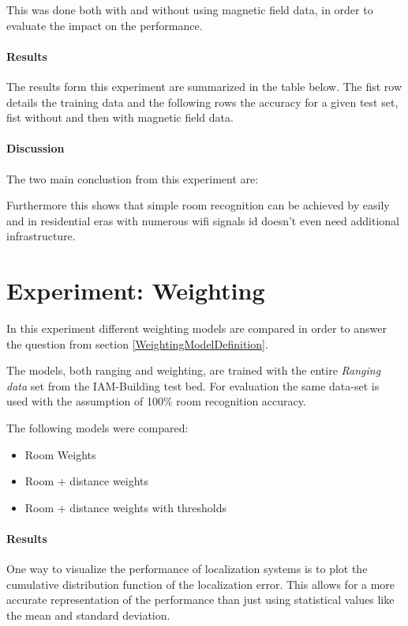 This was done both with and without using magnetic field data, in order to evaluate the impact  on the performance.

\paragraph{Results}
The results form this experiment are summarized in the table below. The fist row details the training data and the following rows the accuracy for a given test set, fist without and then with magnetic field data.


\paragraph{Discussion}

The two main conclustion from this experiment are:



Furthermore this shows that simple room recognition can be achieved by easily and in residential eras with numerous wifi signals id doesn't even need additional infrastructure.
\section{Experiment: Weighting}
In this experiment different weighting models are compared in order to answer the question from section \ref{WeightingModelDefinition}.

The models, both ranging and weighting, are trained with the entire \emph{Ranging data} set from the IAM-Building test bed. For evaluation the same data-set is used with the assumption of 100\% room recognition accuracy.

The following models were compared:

\begin{itemize}
\item Room Weights
\item Room + distance weights
\item Room + distance weights with thresholds

\end{itemize}

\paragraph{Results}
One way to visualize the performance of localization systems is to plot the cumulative distribution function of the localization error. This allows for a more accurate representation of the performance than just using statistical values like the mean and standard deviation.


